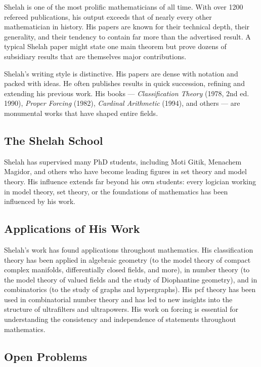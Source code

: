 Shelah is one of the most prolific mathematicians of all time. With over 1200 refereed publications, his output exceeds that of nearly every other mathematician in history. His papers are known for their technical depth, their generality, and their tendency to contain far more than the advertised result. A typical Shelah paper might state one main theorem but prove dozens of subsidiary results that are themselves major contributions.

Shelah's writing style is distinctive. His papers are dense with notation and packed with ideas. He often publishes results in quick succession, refining and extending his previous work. His books --- \textit{Classification Theory} (1978, 2nd ed. 1990), \textit{Proper Forcing} (1982), \textit{Cardinal Arithmetic} (1994), and others --- are monumental works that have shaped entire fields.

\subsection{The Shelah School}

Shelah has supervised many PhD students, including Moti Gitik, Menachem Magidor, and others who have become leading figures in set theory and model theory. His influence extends far beyond his own students: every logician working in model theory, set theory, or the foundations of mathematics has been influenced by his work.

\subsection{Applications of His Work}

Shelah's work has found applications throughout mathematics. His classification theory has been applied in algebraic geometry (to the model theory of compact complex manifolds, differentially closed fields, and more), in number theory (to the model theory of valued fields and the study of Diophantine geometry), and in combinatorics (to the study of graphs and hypergraphs). His pcf theory has been used in combinatorial number theory and has led to new insights into the structure of ultrafilters and ultrapowers. His work on forcing is essential for understanding the consistency and independence of statements throughout mathematics.

\subsection{Open Problems}

